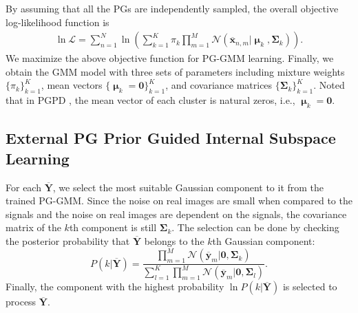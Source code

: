 \documentclass[10pt,twocolumn,letterpaper]{article}
\begin{document}
By assuming that all the PGs are independently sampled, the overall objective log-likelihood function is
\begin{equation}\label{equ2}
\begin{split}
\ln\mathcal{L}=\sum_{n=1}^{N} \ln(\sum_{k=1}^{K}\pi_{k}\prod_{m=1}^{M}\mathcal{N}(\mathbf{\overline{x}}_{n,m}|\boldsymbol{\upmu}_{k},\mathbf{\Sigma}_{k})).
\end{split}
\end{equation} 
We maximize the above objective function for PG-GMM learning. Finally, we obtain the GMM model with three sets of parameters including mixture weights $\{\pi_{k}\}_{k=1}^{K}$, mean vectors $\{\boldsymbol{\upmu}_{k}=\mathbf{0}\}_{k=1}^{K}$, and covariance matrices $\{\mathbf{\Sigma}_{k}\}_{k=1}^{K}$. Noted that in PGPD \cite{pgpd}, the mean vector of each cluster is natural zeros, i.e., $\boldsymbol{\upmu}_{k}=\mathbf{0}$.

\subsection{External PG Prior Guided Internal Subspace Learning}
For each $\mathbf{\overline{Y}}$, we select the most suitable Gaussian component to it from the trained PG-GMM. Since the noise on real images are small when compared to the signals and the noise on real images are dependent on the signals, the covariance matrix of the $k$th component is still $\mathbf{\Sigma}_{k}$. The selection can be done by checking the posterior probability that $\mathbf{\overline{Y}}$ belongs to the $k$th Gaussian component:
\begin{equation}\label{equ3}
P(k|\mathbf{\overline{Y}})=\frac{\prod_{m=1}^{M}\mathcal{N}(\mathbf{\overline{y}}_{m}|\mathbf{0},\mathbf{\Sigma}_{k})}{\sum_{l=1}^{K}\prod_{m=1}^{M}\mathcal{N}(\mathbf{\overline{y}}_{m}|\mathbf{0},\mathbf{\Sigma}_{l})}.
\end{equation}
Finally, the component with the highest probability $\ln P(k|\mathbf{\overline{Y}})$ is selected to process $\mathbf{\overline{Y}}$.
\end{document}
